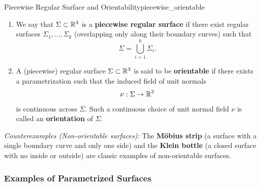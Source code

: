 \begin{definition}{Piecewise Regular Surface and Orientability}{piecewise_orientable}
\begin{enumerate}[label=\textbf{\arabic*)}]
    \item We say that $\Sigma \subset \mathbb{R}^3$ is a \textbf{piecewise regular surface} if there exist regular surfaces $\Sigma_1, \dots, \Sigma_k$ (overlapping only along their boundary curves) such that
    \[
        \Sigma = \bigcup_{i=1}^{k} \Sigma_i.
    \]
    \item A (piecewise) regular surface $\Sigma \subset \mathbb{R}^3$ is said to be \textbf{orientable} if there exists a parametrization such that the induced field of unit normals
    \[
        \nu : \Sigma \to \mathbb{R}^3
    \]
    is continuous across $\Sigma$. Such a continuous choice of unit normal field $\nu$ is called an \textbf{orientation} of $\Sigma$.
\end{enumerate}
\emph{Counterexamples (Non-orientable surfaces):} The \textbf{M\"obius strip} (a surface with a single boundary curve and only one side) and the \textbf{Klein bottle} (a closed surface with no inside or outside) are classic examples of non-orientable surfaces.
\end{definition}

\subsubsection{Examples of Parametrized Surfaces}

